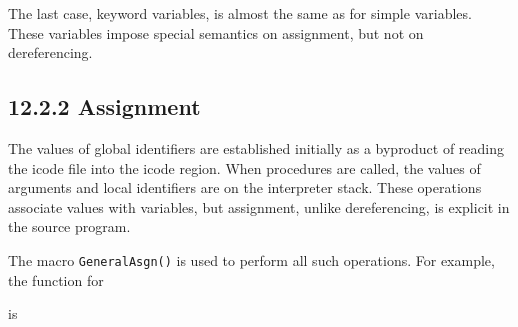 The last case, keyword variables, is almost the same as for
simple variables. These variables impose special semantics on
assignment, but not on dereferencing.

\goodbreak
{}

\subsection[12.2.2 Assignment]{12.2.2 Assignment}

The values of global identifiers are established initially as a
byproduct of reading the icode file into the icode region. When
procedures are called, the values of arguments and local identifiers
are on the interpreter stack. These operations associate values with
variables, but assignment, unlike dereferencing, is explicit in the
source program.


The macro \texttt{GeneralAsgn()} is used to perform all such
operations. For example, the function for


is

